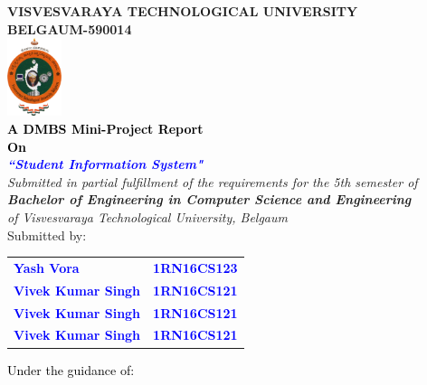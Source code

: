 \thispagestyle{empty}
\begin{titlepage}
\begin{center}
\textup{\large {\textcolor{darkbrown}{\bf VISVESVARAYA TECHNOLOGICAL UNIVERSITY} \\ {\textcolor{darkbrown}{\bf BELGAUM-590014}}}}\\
\includegraphics[width=0.12\textwidth]{./VTU.png}\\
\textup{\small {\textcolor{black}{\textbf {A DMBS Mini-Project Report} \\ {\textbf {On}}}}} \\
\textup{\large {\textcolor{blue}{\textbf {\textit {``Student Information System"}}}}} \\[0.2in]
\textup{{\textit {Submitted in partial fulfillment of the requirements for the 5th semester of} \\ {\textbf {\textit {Bachelor of Engineering in Computer Science and Engineering}} \\ \textit {of Visvesvaraya Technological University, Belgaum}}}}\\


\textup{{Submitted by:}} 
\break\break
\begin{tabular}{l l}
\textcolor{blue}{\textbf{Yash Vora}} & \textcolor{blue}{\hspace{2.7cm}\textbf{1RN16CS123}}\\
\textcolor{blue}{\textbf{Vivek Kumar Singh}} & \textcolor{blue}{\hspace{2.7cm}\textbf{1RN16CS121}}\\
\textcolor{blue}{\textbf{Vivek Kumar Singh}} & \textcolor{blue}{\hspace{2.7cm}\textbf{1RN16CS121}}\\
\textcolor{blue}{\textbf{Vivek Kumar Singh}} & \textcolor{blue}{\hspace{2.7cm}\textbf{1RN16CS121}}\\
\end{tabular}
\vfill
\textup{\normalsize{\textcolor{black}{ Under the guidance of:}}}\break\break


\end{center}
\end{titlepage}
